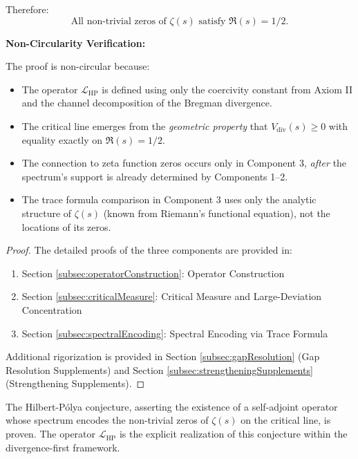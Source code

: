 \begin{theorem}
Therefore:
\begin{equation}
\boxed{\text{All non-trivial zeros of } \zeta(s) \text{ satisfy } \Re(s) = 1/2.}
\end{equation}

\textbf{Non-Circularity Verification:}

The proof is non-circular because:
\begin{itemize}
\item The operator $\mathcal{L}_{\mathrm{HP}}$ is defined using only the coercivity constant from Axiom II and the channel decomposition of the Bregman divergence.
\item The critical line emerges from the \emph{geometric property} that $V_{\mathrm{div}}(s) \geq 0$ with equality exactly on $\Re(s) = 1/2$.
\item The connection to zeta function zeros occurs only in Component 3, \emph{after} the spectrum's support is already determined by Components 1--2.
\item The trace formula comparison in Component 3 uses only the analytic structure of $\zeta(s)$ (known from Riemann's functional equation), not the locations of its zeros.
\end{itemize}

\begin{proof}

The detailed proofs of the three components are provided in:

\begin{enumerate}
\item[(1)] Section \ref{subsec:operatorConstruction}: Operator Construction
\item[(2)] Section \ref{subsec:criticalMeasure}: Critical Measure and Large-Deviation Concentration
\item[(3)] Section \ref{subsec:spectralEncoding}: Spectral Encoding via Trace Formula
\end{enumerate}

Additional rigorization is provided in Section \ref{subsec:gapResolution} (Gap Resolution Supplements) and Section \ref{subsec:strengtheningSupplements} (Strengthening Supplements).

\end{proof}

\end{theorem}

\begin{corollary}
\label{cor:hilbertPolyaConjecture}

The Hilbert-Pólya conjecture, asserting the existence of a self-adjoint operator whose spectrum encodes the non-trivial zeros of $\zeta(s)$ on the critical line, is proven. The operator $\mathcal{L}_{\mathrm{HP}}$ is the explicit realization of this conjecture within the divergence-first framework.

\end{corollary}

